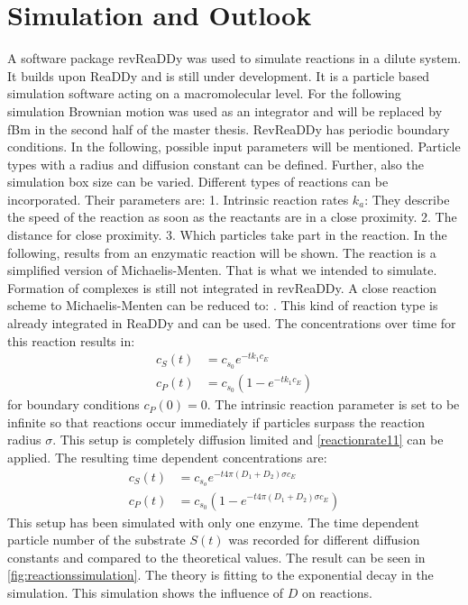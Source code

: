 \documentclass[
  a4paper,BCOR10mm,oneside,
  bibtotoc,idxtotoc,
  headsepline,footsepline,%
  fleqn,openbib
]{scrbook}
\begin{document}
\section{Simulation and Outlook}
A software package revReaDDy was used to simulate reactions in a dilute system. It builds upon ReaDDy \cite{Johannesschoneberg2014} and is still under development. It is a particle based simulation software acting on a macromolecular level. For the following simulation Brownian motion was used as an integrator and will be replaced by fBm in the second half of the master thesis. RevReaDDy has periodic boundary conditions. In the following, possible input parameters will be mentioned.  Particle types with a radius and diffusion constant can be defined. Further, also the simulation box size can be varied. Different types of reactions can be incorporated. Their parameters are: 1. Intrinsic reaction rates $k_a$: They describe the speed of the reaction as soon as the reactants are in a close proximity. 2. The distance for close proximity. 3. Which particles take part in the reaction. \newline In the following, results from an enzymatic reaction will be shown. The reaction is a simplified version of Michaelis-Menten. That is what we intended to simulate. Formation of complexes is still not integrated in revReaDDy. A close reaction scheme to Michaelis-Menten  can be reduced to: . This kind of reaction type  is already integrated in ReaDDy and can be used. The concentrations over time for this reaction results in:
\begin{align}
 c_S(t)&=c_{s_0} e^{- t k_1  c_E} \\
 c_P(t)&=c_{s_0}\left(1- e^{-t k_1  c_E}\right)
\end{align}
for boundary conditions $c_P(0)=0$. The intrinsic reaction parameter is set to be infinite so that reactions occur immediately if particles surpass the reaction radius $\sigma$. This setup is completely diffusion limited and \cref{reactionrate11} can be applied. The resulting time dependent  concentrations are:
\begin{align}
 c_S(t)&=c_{s_o} e^{- t 4 \pi (D_1+D_2) \sigma  c_E}  \label{substratetheo}\\
 c_P(t)&=c_{s_0} \left(1- e^{-t 4 \pi (D_1+D_2) \sigma  c_E}\right)
\end{align}
This setup has been simulated with only one enzyme. The time dependent particle number of the substrate  $S(t)$ was recorded for different diffusion constants and compared to the theoretical values. The result can be seen in \cref{fig:reactionssimulation}. The theory is fitting to the exponential decay in the simulation. This simulation shows the influence of $D$ on reactions. 
\end{document}
